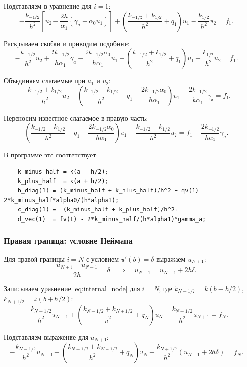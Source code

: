 \documentclass[14pt,a4paper]{extarticle}  %
\numberwithin{equation}{section}
\begin{document}
Подставляем в уравнение для \(i=1\):
\[
-\frac{k_{-1/2}}{h^2}\left[ u_2 - \frac{2h}{\alpha_1}(\gamma_a - \alpha_0 u_1) \right] + 
\left( \frac{k_{-1/2}+k_{1/2}}{h^2} + q_1 \right)u_1 - 
\frac{k_{1/2}}{h^2}u_2 = f_1.
\]

Раскрываем скобки и приводим подобные:
\[
-\frac{k_{-1/2}}{h^2}u_2 + \frac{2k_{-1/2}}{h\alpha_1}\gamma_a - 
\frac{2k_{-1/2}\alpha_0}{h\alpha_1}u_1 + 
\left( \frac{k_{-1/2}+k_{1/2}}{h^2} + q_1 \right)u_1 - 
\frac{k_{1/2}}{h^2}u_2 = f_1.
\]

Объединяем слагаемые при \(u_1\) и \(u_2\):
\[
-\frac{k_{-1/2}+k_{1/2}}{h^2}u_2 + 
\left( \frac{k_{-1/2}+k_{1/2}}{h^2} + q_1 - \frac{2k_{-1/2}\alpha_0}{h\alpha_1} \right)u_1 + 
\frac{2k_{-1/2}}{h\alpha_1}\gamma_a = f_1.
\]

Переносим известное слагаемое в правую часть:
\begin{equation}
    \left( \frac{k_{-1/2}+k_{1/2}}{h^2} + q_1 - \frac{2k_{-1/2}\alpha_0}{h\alpha_1} \right)u_1 - 
    \frac{k_{-1/2}+k_{1/2}}{h^2}u_2 = f_1 - \frac{2k_{-1/2}}{h\alpha_1}\gamma_a.
    \label{eq:left_robin_final}
\end{equation}

В программе это соответствует:

\begin{verbatim}
    k_minus_half = k(a - h/2);
    k_plus_half  = k(a + h/2);
    b_diag(1) = (k_minus_half + k_plus_half)/h^2 + qv(1) - 2*k_minus_half*alpha0/(h*alpha1);
    c_diag(1) = -(k_minus_half + k_plus_half)/h^2;
    d_vec(1)  = fv(1) - 2*k_minus_half/(h*alpha1)*gamma_a;
\end{verbatim}

\subsubsection{Правая граница: условие Неймана}

Для правой границы \(i=N\) с условием \(u'(b) = \delta\) выражаем \(u_{N+1}\):
\[
\frac{u_{N+1} - u_{N-1}}{2h} = \delta \quad\Rightarrow\quad u_{N+1} = u_{N-1} + 2h\delta.
\]

Записываем уравнение \eqref{eq:internal_node} для \(i=N\), где 
\(k_{N-1/2} = k(b - h/2)\), \(k_{N+1/2} = k(b + h/2)\):
\[
-\frac{k_{N-1/2}}{h^2}u_{N-1} + 
\left( \frac{k_{N-1/2}+k_{N+1/2}}{h^2} + q_N \right)u_N - 
\frac{k_{N+1/2}}{h^2}u_{N+1} = f_N.
\]

Подставляем выражение для \(u_{N+1}\):
\[
-\frac{k_{N-1/2}}{h^2}u_{N-1} + 
\left( \frac{k_{N-1/2}+k_{N+1/2}}{h^2} + q_N \right)u_N - 
\frac{k_{N+1/2}}{h^2}(u_{N-1} + 2h\delta) = f_N.
\]
\end{document}
